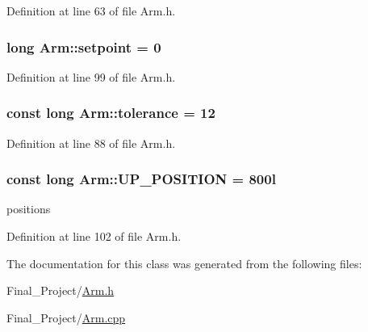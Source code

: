 Definition at line 63 of file Arm.\-h.

\hypertarget{classArm_aa168ca685ff8170699ca535590c2af14}{
\subsubsection[{setpoint}]{\setlength{\rightskip}{0pt plus 5cm}long Arm\-::setpoint = 0\hspace{0.3cm}{\ttfamily [private]}}}\label{classArm_aa168ca685ff8170699ca535590c2af14}


Definition at line 99 of file Arm.\-h.

\hypertarget{classArm_afb4e56fd59b92d0b4c157c0ea7fe9db8}{
\subsubsection[{tolerance}]{\setlength{\rightskip}{0pt plus 5cm}const long Arm\-::tolerance = 12\hspace{0.3cm}{\ttfamily [private]}}}\label{classArm_afb4e56fd59b92d0b4c157c0ea7fe9db8}


Definition at line 88 of file Arm.\-h.

\hypertarget{classArm_a44fed3661f22f9acd7f3cd8635a4fc6a}{
\subsubsection[{U\-P\-\_\-\-P\-O\-S\-I\-T\-I\-O\-N}]{\setlength{\rightskip}{0pt plus 5cm}const long Arm\-::\-U\-P\-\_\-\-P\-O\-S\-I\-T\-I\-O\-N = 800l\hspace{0.3cm}{\ttfamily [private]}}}\label{classArm_a44fed3661f22f9acd7f3cd8635a4fc6a}
positions 

Definition at line 102 of file Arm.\-h.



The documentation for this class was generated from the following files\-:\begin{DoxyCompactItemize}
\item 
Final\-\_\-\-Project/\hyperlink{Arm_8h}{Arm.\-h}\item 
Final\-\_\-\-Project/\hyperlink{Arm_8cpp}{Arm.\-cpp}\end{DoxyCompactItemize}
